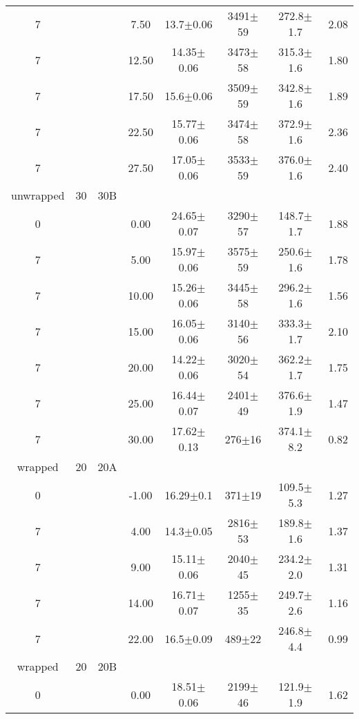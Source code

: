 \begin{tabular}{ccccccc}
7
 &  &  &       7.50 &    13.7$\pm$0.06 &  3491$\pm$59 &  272.8$\pm$1.7 &        2.08 \\
7
 &  &  &      12.50 &   14.35$\pm$0.06 &  3473$\pm$58 &  315.3$\pm$1.6 &        1.80 \\
7
 &  &  &      17.50 &    15.6$\pm$0.06 &  3509$\pm$59 &  342.8$\pm$1.6 &        1.89 \\
7
 &  &  &      22.50 &   15.77$\pm$0.06 &  3474$\pm$58 &  372.9$\pm$1.6 &        2.36 \\
7
 &  &  &      27.50 &   17.05$\pm$0.06 &  3533$\pm$59 &  376.0$\pm$1.6 &        2.40 \\
unwrapped & 30 & 30B &   &   &   &   & \\
0
 &  &  &       0.00 &   24.65$\pm$0.07 &  3290$\pm$57 &  148.7$\pm$1.7 &        1.88 \\
7
 &  &  &       5.00 &   15.97$\pm$0.06 &  3575$\pm$59 &  250.6$\pm$1.6 &        1.78 \\
7
 &  &  &      10.00 &   15.26$\pm$0.06 &  3445$\pm$58 &  296.2$\pm$1.6 &        1.56 \\
7
 &  &  &      15.00 &   16.05$\pm$0.06 &  3140$\pm$56 &  333.3$\pm$1.7 &        2.10 \\
7
 &  &  &      20.00 &   14.22$\pm$0.06 &  3020$\pm$54 &  362.2$\pm$1.7 &        1.75 \\
7
 &  &  &      25.00 &   16.44$\pm$0.07 &  2401$\pm$49 &  376.6$\pm$1.9 &        1.47 \\
7
 &  &  &      30.00 &   17.62$\pm$0.13 &   276$\pm$16 &  374.1$\pm$8.2 &        0.82 \\
wrapped & 20 & 20A &   &   &   &   & \\
0
 &  &  &      -1.00 &    16.29$\pm$0.1 &   371$\pm$19 &  109.5$\pm$5.3 &        1.27 \\
7
 &  &  &       4.00 &    14.3$\pm$0.05 &  2816$\pm$53 &  189.8$\pm$1.6 &        1.37 \\
7
 &  &  &       9.00 &   15.11$\pm$0.06 &  2040$\pm$45 &  234.2$\pm$2.0 &        1.31 \\
7
 &  &  &      14.00 &   16.71$\pm$0.07 &  1255$\pm$35 &  249.7$\pm$2.6 &        1.16 \\
7
 &  &  &      22.00 &    16.5$\pm$0.09 &   489$\pm$22 &  246.8$\pm$4.4 &        0.99 \\
wrapped & 20 & 20B &   &   &   &   & \\
0
 &  &  &       0.00 &   18.51$\pm$0.06 &  2199$\pm$46 &  121.9$\pm$1.9 &        1.62 \\

\end{tabular}
